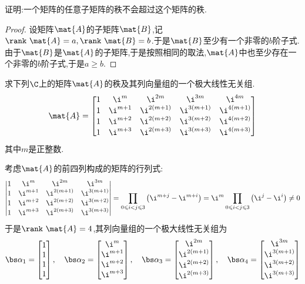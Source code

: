 \documentclass{ctexart}
\begin{document}
\begin{homework}[4]
    证明:一个矩阵的任意子矩阵的秩不会超过这个矩阵的秩.
\end{homework}
\begin{proof}
    设矩阵$\mat{A}$的子矩阵$\mat{B}$,记$\rank\ \mat{A}=a,\rank\ \mat{B}=b$.于是$\mat{B}$至少有一个非零的$b$阶子式.由于$\mat{B}$是$\mat{A}$的子矩阵,于是按照相同的取法,$\mat{A}$中也至少存在一个非零的$b$阶子式,于是$a\geqslant b$.
\end{proof}
\begin{homework}[5]
    求下列$\C$上的矩阵$\mat{A}$的秩及其列向量组的一个极大线性无关组.
    \[\mat{A}=\begin{bmatrix}
        1&\i^m&\i^{2m}&\i^{3m}&\i^{4m}\\
        1&\i^{m+1}&\i^{2(m+1)}&\i^{3(m+1)}&\i^{4(m+1)}\\
        1&\i^{m+2}&\i^{2(m+2)}&\i^{3(m+2)}&\i^{4(m+2)}\\
        1&\i^{m+3}&\i^{2(m+3)}&\i^{3(m+3)}&\i^{4(m+3)}
    \end{bmatrix}\]
    其中$m$是正整数.
\end{homework}
\begin{solution}
    考虑$\mat{A}$的前四列构成的矩阵的行列式:
    \[\begin{vmatrix}
        1&\i^m&\i^{2m}&\i^{3m}\\
        1&\i^{m+1}&\i^{2(m+1)}&\i^{3(m+1)}\\
        1&\i^{m+2}&\i^{2(m+2)}&\i^{3(m+2)}\\
        1&\i^{m+3}&\i^{2(m+3)}&\i^{3(m+3)}
    \end{vmatrix}=\prod_{0\leqslant i<j\leqslant 3}\left(\i^{m+j}-\i^{m+i}\right)=\i^m\prod_{0\leqslant i<j\leqslant 3}\left(\i^j-\i^i\right)\neq0\]
    于是$\rank\ \mat{A}=4$,其列向量组的一个极大线性无关组为
    \[\bs\alpha_1=\begin{bmatrix}
        1\\1\\1\\1
    \end{bmatrix},\quad\bs\alpha_2=\begin{bmatrix}
        \i^m\\\i^{m+1}\\\i^{m+2}\\\i^{m+3}
    \end{bmatrix},\quad\bs\alpha_3=\begin{bmatrix}
        \i^{2m}\\\i^{2(m+1)}\\\i^{2(m+2)}\\\i^{2(m+3)}
    \end{bmatrix},\quad\bs\alpha_4=\begin{bmatrix}
        \i^{3m}\\\i^{3(m+1)}\\\i^{3(m+2)}\\\i^{3(m+3)}
    \end{bmatrix}\]
\end{solution}
\end{document}
